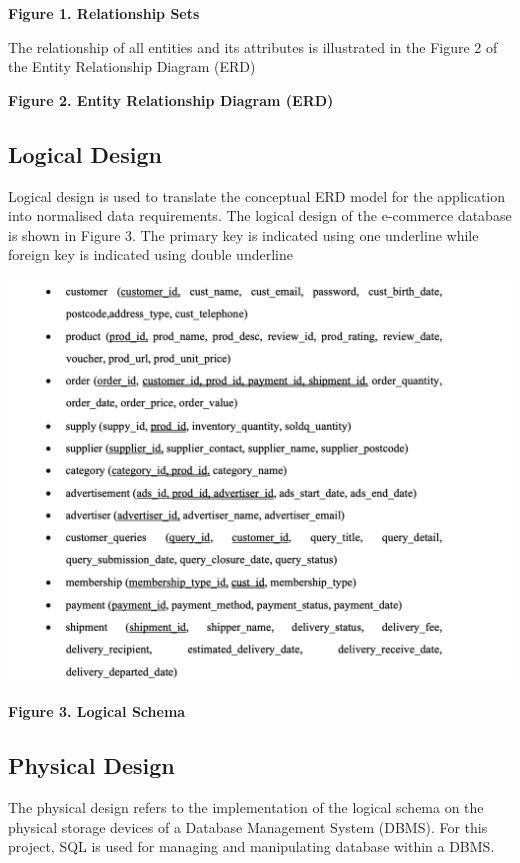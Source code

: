 \documentclass[
  letterpaper,
  DIV=11,
  numbers=noendperiod]{scrartcl}
\begin{document}
\textbf{Figure 1. Relationship Sets}

The relationship of all entities and its attributes is illustrated in
the Figure 2 of the Entity Relationship Diagram (ERD)

\textbf{Figure 2. Entity Relationship Diagram (ERD)}

\hypertarget{logical-design}{%
\subsection{Logical Design}\label{logical-design}}

Logical design is used to translate the conceptual ERD model for the
application into normalised data requirements. The logical design of the
e-commerce database is shown in Figure 3. The primary key is indicated
using one underline while foreign key is indicated using double
underline

\includegraphics[width=6.41667in,height=\textheight]{images/Screenshot 2024-03-18 at 17.44.13.png}

\textbf{Figure 3. Logical Schema}

\hypertarget{physical-design}{%
\subsection{Physical Design}\label{physical-design}}

The physical design refers to the implementation of the logical schema
on the physical storage devices of a Database Management System (DBMS).
For this project, SQL is used for managing and manipulating database
within a DBMS.
\end{document}
